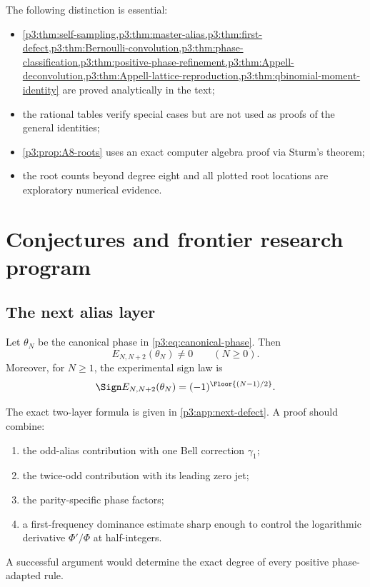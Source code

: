 \documentclass[11pt,oneside]{article}
\numberwithin{equation}{section}
\theoremstyle{definition}
\theoremstyle{remark}
\begin{document}
The following distinction is essential:
\begin{itemize}
\item \cref{p3:thm:self-sampling,p3:thm:master-alias,p3:thm:first-defect,p3:thm:Bernoulli-convolution,p3:thm:phase-classification,p3:thm:positive-phase-refinement,p3:thm:Appell-deconvolution,p3:thm:Appell-lattice-reproduction,p3:thm:qbinomial-moment-identity} are proved analytically in the text;
\item the rational tables verify special cases but are not used as proofs of the general identities;
\item \cref{p3:prop:A8-roots} uses an exact computer algebra proof via Sturm's theorem;
\item the root counts beyond degree eight and all plotted root locations are exploratory numerical evidence.
\end{itemize}

\section{Conjectures and frontier research program}
\label{p3:sec:frontier}

\subsection{The next alias layer}

\begin{conjecture}
\label{p3:conj:next-defect-sign}
Let $\theta_N$ be the canonical phase in \eqref{p3:eq:canonical-phase}.  Then
\begin{equation}
 E_{N,N+2}(\theta_N)\ne0
 \qquad(N\ge0).
 \label{p3:eq:next-defect-nonzero}
\end{equation}
Moreover, for $N\ge1$, the experimental sign law is
\begin{equation}
 \Sign E_{N,N+2}(\theta_N)
 =(-1)^{\Floor{(N-1)/2}}.
 \label{p3:eq:next-defect-sign-conj}
\end{equation}
\end{conjecture}

The exact two-layer formula is given in \cref{p3:app:next-defect}.  A proof should combine:
\begin{enumerate}
\item the odd-alias contribution with one Bell correction $\gamma_1$;
\item the twice-odd contribution with its leading zero jet;
\item the parity-specific phase factors;
\item a first-frequency dominance estimate sharp enough to control the logarithmic derivative $\Phi'/\Phi$ at half-integers.
\end{enumerate}
A successful argument would determine the exact degree of every positive phase-adapted rule.
\end{document}
